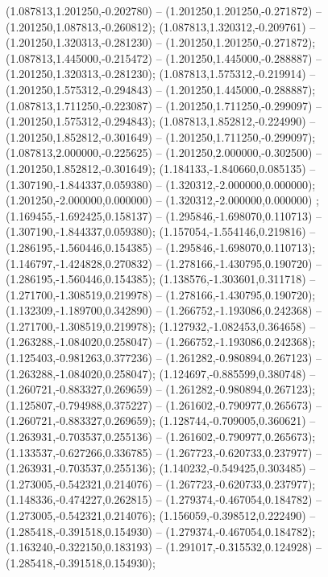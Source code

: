  (1.087813,1.201250,-0.202780) -- (1.201250,1.201250,-0.271872) -- (1.201250,1.087813,-0.260812);
 (1.087813,1.320312,-0.209761) -- (1.201250,1.320313,-0.281230) -- (1.201250,1.201250,-0.271872);
 (1.087813,1.445000,-0.215472) -- (1.201250,1.445000,-0.288887) -- (1.201250,1.320313,-0.281230);
 (1.087813,1.575312,-0.219914) -- (1.201250,1.575312,-0.294843) -- (1.201250,1.445000,-0.288887);
 (1.087813,1.711250,-0.223087) -- (1.201250,1.711250,-0.299097) -- (1.201250,1.575312,-0.294843);
 (1.087813,1.852812,-0.224990) -- (1.201250,1.852812,-0.301649) -- (1.201250,1.711250,-0.299097);
 (1.087813,2.000000,-0.225625) -- (1.201250,2.000000,-0.302500) -- (1.201250,1.852812,-0.301649);
 (1.184133,-1.840660,0.085135) -- (1.307190,-1.844337,0.059380) -- (1.320312,-2.000000,0.000000);
 (1.201250,-2.000000,0.000000) -- (1.320312,-2.000000,0.000000) ;
 (1.169455,-1.692425,0.158137) -- (1.295846,-1.698070,0.110713) -- (1.307190,-1.844337,0.059380);
 (1.157054,-1.554146,0.219816) -- (1.286195,-1.560446,0.154385) -- (1.295846,-1.698070,0.110713);
 (1.146797,-1.424828,0.270832) -- (1.278166,-1.430795,0.190720) -- (1.286195,-1.560446,0.154385);
 (1.138576,-1.303601,0.311718) -- (1.271700,-1.308519,0.219978) -- (1.278166,-1.430795,0.190720);
 (1.132309,-1.189700,0.342890) -- (1.266752,-1.193086,0.242368) -- (1.271700,-1.308519,0.219978);
 (1.127932,-1.082453,0.364658) -- (1.263288,-1.084020,0.258047) -- (1.266752,-1.193086,0.242368);
 (1.125403,-0.981263,0.377236) -- (1.261282,-0.980894,0.267123) -- (1.263288,-1.084020,0.258047);
 (1.124697,-0.885599,0.380748) -- (1.260721,-0.883327,0.269659) -- (1.261282,-0.980894,0.267123);
 (1.125807,-0.794988,0.375227) -- (1.261602,-0.790977,0.265673) -- (1.260721,-0.883327,0.269659);
 (1.128744,-0.709005,0.360621) -- (1.263931,-0.703537,0.255136) -- (1.261602,-0.790977,0.265673);
 (1.133537,-0.627266,0.336785) -- (1.267723,-0.620733,0.237977) -- (1.263931,-0.703537,0.255136);
 (1.140232,-0.549425,0.303485) -- (1.273005,-0.542321,0.214076) -- (1.267723,-0.620733,0.237977);
 (1.148336,-0.474227,0.262815) -- (1.279374,-0.467054,0.184782) -- (1.273005,-0.542321,0.214076);
 (1.156059,-0.398512,0.222490) -- (1.285418,-0.391518,0.154930) -- (1.279374,-0.467054,0.184782);
 (1.163240,-0.322150,0.183193) -- (1.291017,-0.315532,0.124928) -- (1.285418,-0.391518,0.154930);
